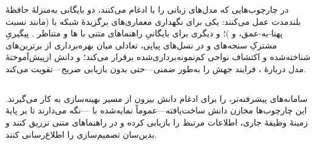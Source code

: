 
\subsubsection{\protect{}}

در چارچوب‌هایی که مدل‌های زبانی را با  ادغام می‌کنند، دو بایگانی به‌منزلهٔ حافظهٔ بلندمدت عمل می‌کنند: یکی برای نگهداری معماری‌های برگزیدهٔ شبکه با  (مانند نسبت پهنا-به-عمق، و )؛ و دیگری برای بایگانیِ راهنماهای متنی با ها و  متناظر \cite{LLMatic2024}. پیگیریِ مشترکِ سنجه‌های  و  در نسل‌های پیاپی، تعادلی میان بهره‌برداری از برترین‌های شناخته‌شده و اکتشاف نواحی کم‌نمونه‌برداری‌شده برقرار می‌کند؛ و دانش ازپیش‌آموختهٔ مدل دربارهٔ ، فرایند جهش را به‌طور ضمنی—حتی بدون بازیابی صریح—تقویت می‌کند.

\subsection[دانش بیرونی: بازیابی از ادبیات و مخازن]{}

سامانه‌های پیشرفته‌تر،  را برای ادغام دانش بیرون از مسیر بهینه‌سازی به کار می‌گیرند. این چارچوب‌ها مخازن دانش ساخت‌یافته—عموماً  نمایه‌شده با —نگه می‌دارند تا بر پایهٔ زمینهٔ وظیفهٔ جاری، اطلاعات مرتبط را بازیابی کرده و در راهنماهای متنی تزریق کنند و بدین‌سان تصمیم‌سازی را اطلاع‌رسانی کنند.

